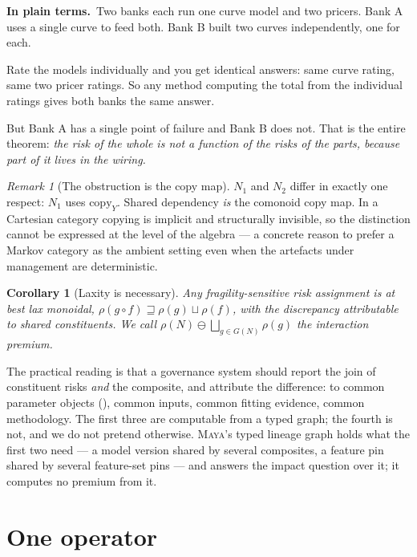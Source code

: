 \documentclass[11pt,a4paper]{article}
\renewcommand{\_}{\oldunderscore\allowbreak}
\theoremstyle{plain}
\newtheorem{corollary}[theorem]{Corollary}
\theoremstyle{definition}
\theoremstyle{definition}
\theoremstyle{remark}
\newtheorem{remark}[theorem]{Remark}
\newcommand{\defn}[1]{\emph{#1}}
\newcommand{\pt}{\textbf{In plain terms.}\ }
\begin{document}
\begin{plain}
\pt Two banks each run one curve model and two pricers. Bank A uses a single curve to feed both. Bank B
built two curves independently, one for each.

Rate the models individually and you get identical answers: same curve rating, same two pricer ratings.
So any method computing the total from the individual ratings gives both banks the same answer.

But Bank A has a single point of failure and Bank B does not. That is the entire theorem: \emph{the risk
of the whole is not a function of the risks of the parts, because part of it lives in the wiring.}
\end{plain}

\begin{remark}[The obstruction is the copy map]\label{rem:copy}
$N_1$ and $N_2$ differ in exactly one respect: $N_1$ uses $\mathrm{copy}_Y$. Shared dependency \emph{is}
the comonoid copy map. In a Cartesian category copying is implicit and structurally invisible, so the
distinction cannot be expressed at the level of the algebra --- a concrete reason to prefer a Markov
category as the ambient setting even when the artefacts under management are deterministic.
\end{remark}

\begin{corollary}[Laxity is necessary]\label{cor:lax}
Any fragility-sensitive risk assignment is at best lax monoidal,
$\rho(g \circ f) \sqsupseteq \rho(g) \sqcup \rho(f)$, with the discrepancy attributable to shared
constituents. We call $\rho(N) \ominus \bigsqcup_{g \in G(N)} \rho(g)$ the \defn{interaction premium}.
\end{corollary}

The practical reading is that a governance system should report the join of constituent risks
\emph{and} the composite, and attribute the difference: to common parameter objects
(), common inputs, common fitting evidence, common methodology. The first three are
computable from a typed graph; the fourth is not, and we do not pretend otherwise.
\textsc{Maya}'s typed lineage graph holds what the first two need --- a model version shared by
several composites, a feature pin shared by several feature-set pins --- and answers the impact question
over it; it computes no premium from it.

\section{One operator}\label{sec:asof}
\end{document}
